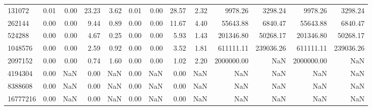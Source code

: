 \begin{tabular}{lrrrrrrrrrrrr}
131072 & 0.01 & 0.00 & 23.23 & 3.62 & 0.01 & 0.00 & 28.57 & 2.32 & 9978.26 & 3298.24 & 9978.26 & 3298.24 \\
262144 & 0.00 & 0.00 & 9.44 & 0.89 & 0.00 & 0.00 & 11.67 & 4.40 & 55643.88 & 6840.47 & 55643.88 & 6840.47 \\
524288 & 0.00 & 0.00 & 4.67 & 0.25 & 0.00 & 0.00 & 5.93 & 1.43 & 201346.80 & 50268.17 & 201346.80 & 50268.17 \\
1048576 & 0.00 & 0.00 & 2.59 & 0.92 & 0.00 & 0.00 & 3.52 & 1.81 & 611111.11 & 239036.26 & 611111.11 & 239036.26 \\
2097152 & 0.00 & 0.00 & 0.74 & 1.60 & 0.00 & 0.00 & 1.02 & 2.20 & 2000000.00 & NaN & 2000000.00 & NaN \\
4194304 & 0.00 & NaN & 0.00 & NaN & 0.00 & NaN & 0.00 & NaN & NaN & NaN & NaN & NaN \\
8388608 & 0.00 & NaN & 0.00 & NaN & 0.00 & NaN & 0.00 & NaN & NaN & NaN & NaN & NaN \\
16777216 & 0.00 & NaN & 0.00 & NaN & 0.00 & NaN & 0.00 & NaN & NaN & NaN & NaN & NaN \\
\bottomrule
\end{tabular}
